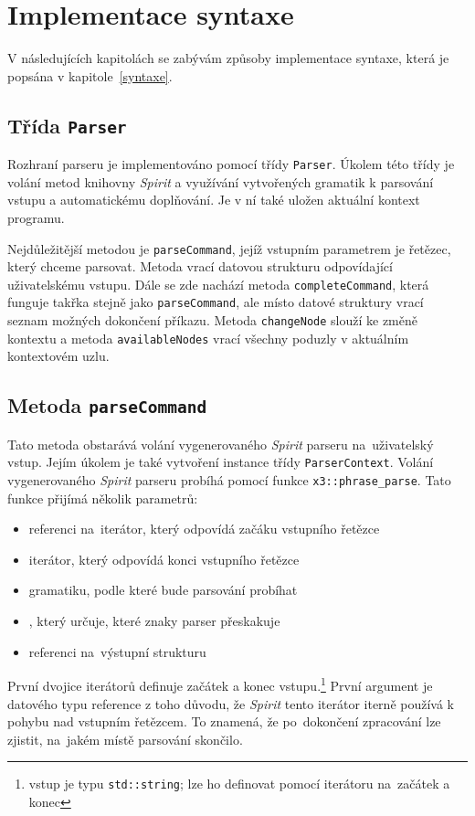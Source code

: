 \documentclass[thesis=B,czech,hidelinks]{FITthesis}[2019/03/06]
\begin{document}
\section{Implementace syntaxe}\label{syntax:impl}
V následujících kapitolách se zabývám způsoby implementace syntaxe, která je popsána v kapitole~\ref{syntaxe}.

\subsection{Třída \texttt{Parser}}
Rozhraní parseru je implementováno pomocí třídy \texttt{Parser}. Úkolem této třídy je volání metod knihovny \textit{Spirit} a využívání vytvořených gramatik k parsování vstupu a automatickému doplňování. Je v ní také uložen aktuální kontext programu.

Nejdůležitější metodou je \texttt{parseCommand}, jejíž vstupním parametrem je řetězec, který chceme parsovat. Metoda vrací datovou strukturu odpovídající uživatelskému vstupu. Dále se zde nachází metoda \texttt{completeCommand}, která funguje takřka stejně jako \texttt{parseCommand}, ale místo datové struktury vrací seznam možných dokončení příkazu. Metoda \texttt{changeNode} slouží ke změně kontextu a metoda \texttt{availableNodes} vrací všechny poduzly v aktuálním kontextovém uzlu.

\subsection{Metoda \texttt{parseCommand}}
Tato metoda obstarává volání vygenerovaného \textit{Spirit} parseru na~uživatelský vstup. Jejím úkolem je také vytvoření instance třídy \texttt{ParserContext}. Volání vygenerovaného \textit{Spirit} parseru probíhá pomocí funkce \texttt{x3::phrase\_parse}. Tato funkce přijímá několik parametrů:

\begin{itemize}
    \item referenci na~iterátor, který odpovídá začáku vstupního řetězce
    \item iterátor, který odpovídá konci vstupního řetězce
    \item gramatiku, podle které bude parsování probíhat
    \item {}, který určuje, které znaky parser přeskakuje
    \item referenci na~výstupní strukturu
\end{itemize}
První dvojice iterátorů definuje začátek a konec vstupu.\footnote{vstup je typu \texttt{std::string}; lze ho definovat pomocí iterátoru na~začátek a konec} První argument je datového typu reference z toho důvodu, že \textit{Spirit} tento iterátor iterně používá k pohybu nad vstupním řetězcem. To znamená, že po~dokončení zpracování lze zjistit, na~jakém místě parsování skončilo.
\end{document}
